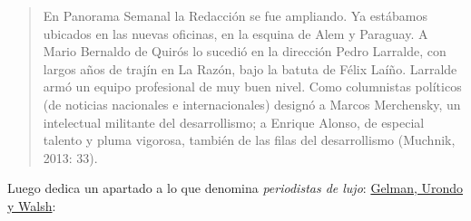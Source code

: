 \begin{quote}
En Panorama Semanal la Redacción se fue ampliando. Ya estábamos ubicados en las nuevas oficinas, en la esquina de Alem y Paraguay. A Mario Bernaldo de Quirós lo sucedió en la dirección Pedro Larralde, con largos años de trajín en La Razón, bajo la batuta de Félix Laíño. Larralde armó un equipo profesional de muy buen nivel. Como columnistas políticos (de noticias nacionales e internacionales) designó a Marcos Merchensky, un intelectual militante del desarrollismo; a Enrique Alonso, de especial talento y pluma vigorosa, también de las filas del desarrollismo (Muchnik, 2013: 33).
\end{quote}

Luego dedica un apartado a lo que denomina \emph{periodistas de lujo}: \protect\hyperlink{_bookmark8}{Gelman, Urondo y Walsh}:

